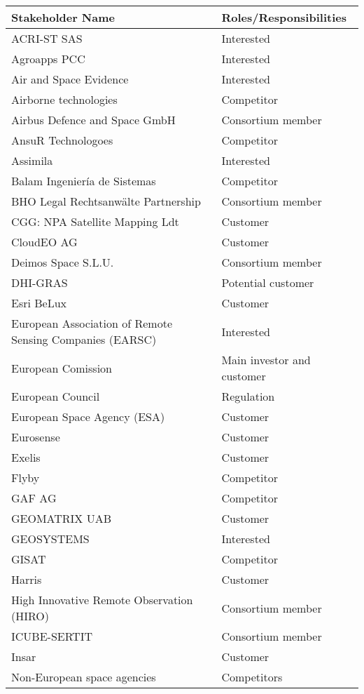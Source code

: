 \begin{longtable}{p{9cm}l}

	\toprule[2pt]
		
	\textbf{Stakeholder Name} & \textbf{Roles/Responsibilities } 
	\\ \midrule[1.5pt]

	ACRI-ST SAS & Interested\\
	Agroapps PCC & Interested\\
	Air and Space Evidence & Interested\\
	Airborne technologies & Competitor\\
	Airbus Defence and Space GmbH & Consortium member  \\ 
	AnsuR Technologoes & Competitor\\
	Assimila & Interested\\
	Balam Ingeniería de Sistemas & Competitor\\
	BHO Legal Rechtsanwälte Partnership & Consortium member\\ 
	CGG: NPA Satellite Mapping Ldt&Customer\\
	CloudEO AG&Customer\\
	Deimos Space S.L.U.  & Consortium member \\
	DHI-GRAS&Potential customer\\
	Esri BeLux&Customer\\
	European Association of Remote Sensing Companies (EARSC)&Interested\\
	European Comission&Main investor and customer\\
	European Council&Regulation\\
	European Space Agency (ESA)&Customer\\ 
	Eurosense&Customer\\
	Exelis&Customer\\
	Flyby&Competitor\\
	GAF AG&Competitor\\
	GEOMATRIX UAB&Customer\\
	GEOSYSTEMS&Interested\\
	GISAT&Competitor\\
	Harris&Customer\\
	High Innovative Remote Observation (HIRO) & Consortium member \\ 
	ICUBE-SERTIT                        & Consortium member \\ 
	Insar&Customer\\
	Non-European space agencies&Competitors\\

\end{longtable}

